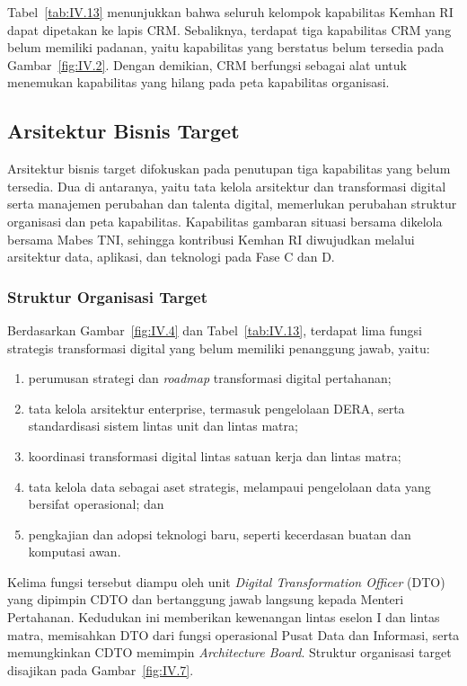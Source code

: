 Tabel~\ref{tab:IV.13} menunjukkan bahwa seluruh kelompok kapabilitas Kemhan RI dapat dipetakan ke lapis CRM. Sebaliknya, terdapat tiga kapabilitas CRM yang belum memiliki padanan, yaitu kapabilitas yang berstatus belum tersedia pada Gambar~\ref{fig:IV.2}. Dengan demikian, CRM berfungsi sebagai alat untuk menemukan kapabilitas yang hilang pada peta kapabilitas organisasi.

\subsection{Arsitektur Bisnis Target}
\label{sec:IV.4.4}

Arsitektur bisnis target difokuskan pada penutupan tiga kapabilitas yang belum tersedia. Dua di antaranya, yaitu tata kelola arsitektur dan transformasi digital serta manajemen perubahan dan talenta digital, memerlukan perubahan struktur organisasi dan peta kapabilitas. Kapabilitas gambaran situasi bersama dikelola bersama Mabes TNI, sehingga kontribusi Kemhan RI diwujudkan melalui arsitektur data, aplikasi, dan teknologi pada Fase C dan D.

\subsubsection{Struktur Organisasi Target}
\label{sec:IV.4.4.1}

Berdasarkan Gambar~\ref{fig:IV.4} dan Tabel~\ref{tab:IV.13}, terdapat lima fungsi strategis transformasi digital yang belum memiliki penanggung jawab, yaitu:

\begin{enumerate}[label=\arabic*.]
\item perumusan strategi dan \textit{roadmap} transformasi digital pertahanan;
\item tata kelola arsitektur enterprise, termasuk pengelolaan DERA, serta standardisasi sistem lintas unit dan lintas matra;
\item koordinasi transformasi digital lintas satuan kerja dan lintas matra;
\item tata kelola data sebagai aset strategis, melampaui pengelolaan data yang bersifat operasional; dan
\item pengkajian dan adopsi teknologi baru, seperti kecerdasan buatan dan komputasi awan.
\end{enumerate}

Kelima fungsi tersebut diampu oleh unit \textit{Digital Transformation Officer} (DTO\label{sk:DTO}) yang dipimpin CDTO dan bertanggung jawab langsung kepada Menteri Pertahanan. Kedudukan ini memberikan kewenangan lintas eselon I dan lintas matra, memisahkan DTO dari fungsi operasional Pusat Data dan Informasi, serta memungkinkan CDTO memimpin \textit{Architecture Board}. Struktur organisasi target disajikan pada Gambar~\ref{fig:IV.7}.

